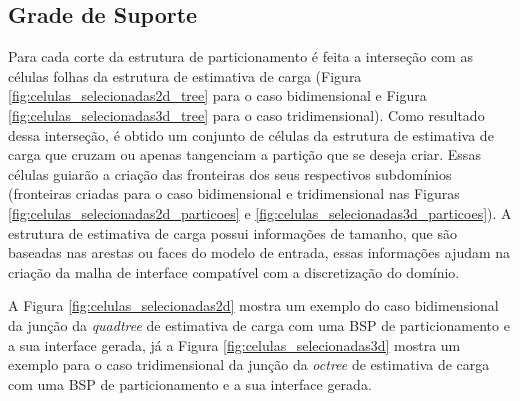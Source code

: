 \subsection{Grade de Suporte}
\label{sec:Grade_Suporte}

Para cada corte da estrutura de particionamento é feita a interseção com as células folhas da estrutura de estimativa de carga (Figura \ref{fig:celulas_selecionadas2d_tree} para o caso bidimensional e Figura \ref{fig:celulas_selecionadas3d_tree} para o caso tridimensional). Como resultado dessa interseção, é obtido um conjunto de células da estrutura de estimativa de carga que cruzam ou apenas tangenciam a partição que se deseja criar. Essas células guiarão a criação das fronteiras dos seus respectivos subdomínios (fronteiras criadas para o caso bidimensional e tridimensional nas Figuras \ref{fig:celulas_selecionadas2d_particoes} e \ref{fig:celulas_selecionadas3d_particoes}). A estrutura de estimativa de carga possui informações de tamanho, que são baseadas nas arestas ou faces do modelo de entrada, essas informações ajudam na criação da malha de interface compatível com a discretização do domínio.

A Figura \ref{fig:celulas_selecionadas2d} mostra um exemplo do caso bidimensional da junção da \textit{quadtree} de estimativa de carga com uma BSP de particionamento e a sua interface gerada, já a Figura \ref{fig:celulas_selecionadas3d} mostra um exemplo para o caso tridimensional da junção da \textit{octree} de estimativa de carga com uma BSP de particionamento e a sua interface gerada.

